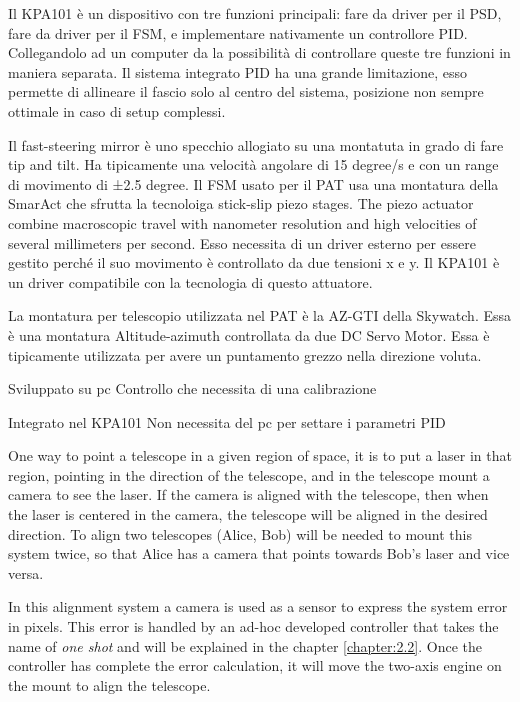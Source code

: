 Il KPA101 è un dispositivo con tre funzioni principali: fare da driver per il PSD, fare da driver per il FSM, e implementare nativamente un controllore PID. Collegandolo ad un computer da la possibilità di controllare queste tre funzioni in maniera separata. Il sistema integrato PID ha una grande limitazione, esso permette di allineare il fascio solo al centro del sistema, posizione non sempre ottimale in caso di setup complessi.


Il fast-steering mirror è uno specchio allogiato su una montatuta in grado di fare tip and tilt. Ha tipicamente una velocità angolare di 15 degree/s e con un range di movimento di ±2.5 degree. Il FSM usato per il PAT usa una montatura della SmarAct che sfrutta la tecnoloiga stick-slip piezo stages. The piezo actuator combine macroscopic travel with nanometer resolution and high velocities of several millimeters per second. Esso necessita di un driver esterno per essere gestito perché il suo movimento è controllato da due tensioni x e y. Il KPA101 è un driver compatibile con la tecnologia di questo attuatore.

La montatura per telescopio utilizzata nel PAT è la AZ-GTI della Skywatch. Essa è una montatura Altitude-azimuth controllata da due DC Servo Motor. Essa è tipicamente utilizzata per avere un puntamento grezzo nella direzione voluta.

Sviluppato su pc
Controllo che necessita di una calibrazione

Integrato nel KPA101
Non necessita del pc per settare i parametri PID

One way to point a telescope in a given region of space, it is to put a laser in that region, pointing in the direction of the telescope, and in the telescope mount a camera to see the laser.
If the camera is aligned with the telescope, then when the laser is centered in the camera, the telescope will be aligned in the desired direction.
To align two telescopes (Alice, Bob) will be needed to mount this system twice, so that Alice has a camera that points towards Bob’s laser and vice versa.

In this alignment system a camera is used as a sensor to express the system error in pixels. This error is handled by an ad-hoc developed controller that takes the name of \textit{one shot} and will be explained in the chapter \ref{chapter:2.2}. Once the controller has complete the error calculation, it will move the two-axis engine on the mount to align the telescope.


